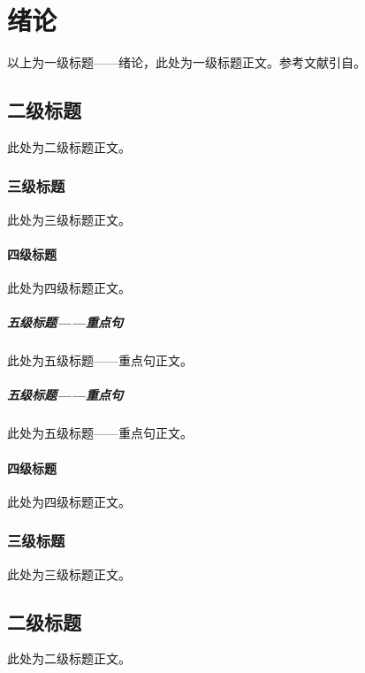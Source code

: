 \chapter{绪论}%
以上为一级标题——绪论，此处为一级标题正文。参考文献引自\cite{tlc}。
\section{二级标题}
此处为二级标题正文。
\subsection{三级标题}
此处为三级标题正文。
\subsubsection{四级标题}
此处为四级标题正文。
\paragraph{五级标题——重点句}
此处为五级标题——重点句正文。
\paragraph{五级标题——重点句}
此处为五级标题——重点句正文。
\subsubsection{四级标题}
此处为四级标题正文。
\subsection{三级标题}
此处为三级标题正文。
\section{二级标题}
此处为二级标题正文。

